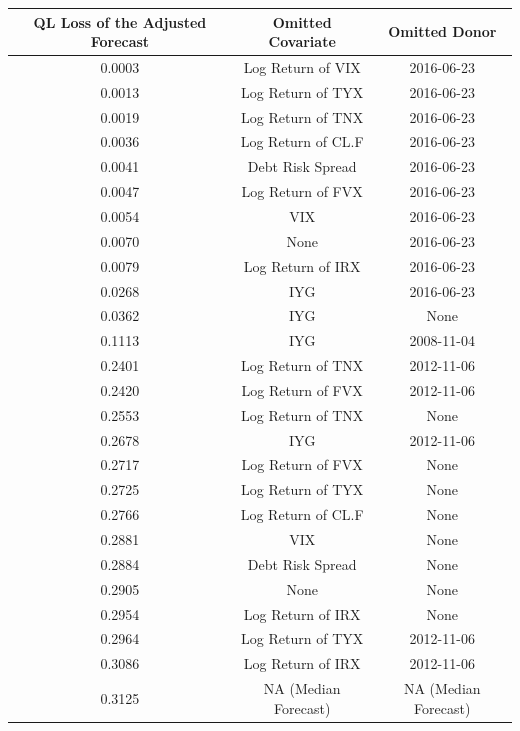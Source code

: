 \documentclass[11pt,3p,review,authoryear]{elsarticle}
\theoremstyle{definition}
\begin{document}
  \begin{table}[ht]
    \centering
     \label{tab:prediction_table_with Brexit as June 23rd, 2016} 
    \begingroup\fontsize{7pt}{8pt}\selectfont
    \begin{tabular}{ccc}
      
      \hline
   QL Loss of the Adjusted Forecast& Omitted Covariate & Omitted Donor \\ 
      \hline
      0.0003 & Log Return of VIX & 2016-06-23 \\ 
  0.0013 & Log Return of TYX & 2016-06-23 \\ 
  0.0019 & Log Return of TNX & 2016-06-23 \\ 
  0.0036 & Log Return of CL.F & 2016-06-23 \\ 
  0.0041 & Debt Risk Spread & 2016-06-23 \\ 
  0.0047 & Log Return of FVX & 2016-06-23 \\ 
  0.0054 & VIX & 2016-06-23 \\ 
  \rowcolor{yellow}0.0070 & None & 2016-06-23 \\ 
  0.0079 & Log Return of IRX & 2016-06-23 \\ 
  0.0268 & IYG & 2016-06-23 \\ 
  0.0362 & IYG & None \\ 
  0.1113 & IYG & 2008-11-04 \\ 
  0.2401 & Log Return of TNX & 2012-11-06 \\ 
  0.2420 & Log Return of FVX & 2012-11-06 \\ 
  0.2553 & Log Return of TNX & None \\ 
  0.2678 & IYG & 2012-11-06 \\ 
  0.2717 & Log Return of FVX & None \\ 
  0.2725 & Log Return of TYX & None \\ 
  0.2766 & Log Return of CL.F & None \\ 
  0.2881 & VIX & None \\ 
  0.2884 & Debt Risk Spread & None \\ 
  \rowcolor{yellow} 0.2905 & None & None \\ 
  0.2954 & Log Return of IRX & None \\ 
  0.2964 & Log Return of TYX & 2012-11-06 \\ 
  0.3086 & Log Return of IRX & 2012-11-06 \\ 
  \rowcolor{gray}0.3125 & NA (Median Forecast) & NA (Median Forecast)\\

\end{tabular}
\end{table}
\end{document}
